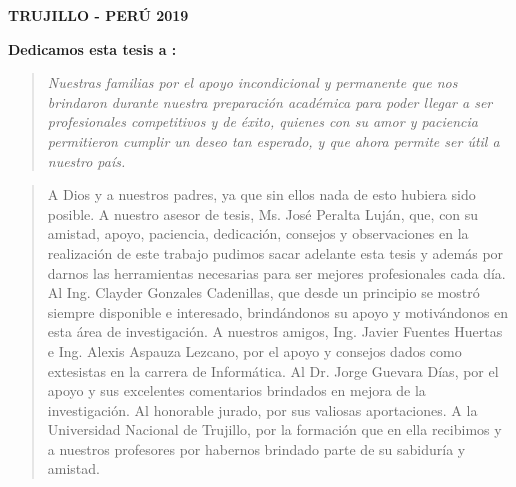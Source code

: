 \vskip 1.1cm
\begin{center}    
{\bf {\fontsize{14}{16.8}\selectfont TRUJILLO - PERÚ
\vskip 0.0cm
\hspace*{-0.2cm} 
2019 }}
\end{center} 
\newpage


 \pagestyle{plain}
 {\bf\Large {Dedicamos esta tesis a :}}
 \vskip 1cm
\begin{quotation}
{\it Nuestras familias por el apoyo incondicional y permanente que nos brindaron durante nuestra preparación académica para poder llegar a ser profesionales competitivos y de éxito, quienes con su amor y paciencia permitieron cumplir un deseo tan esperado, y que ahora permite ser útil a nuestro país.}
\end{quotation}


\newpage

 {\bf\Large {}}
\vskip 0.2cm
\begin{quotation}
A Dios y a nuestros padres, ya que sin ellos nada de esto hubiera sido posible.
{\vskip 0.2cm}
A nuestro asesor de tesis, Ms. José Peralta Luján, que, con su amistad, apoyo, paciencia, dedicación, consejos y observaciones en la realización de este trabajo pudimos sacar adelante esta tesis y además por darnos las herramientas necesarias para ser mejores profesionales cada día.
\vskip 0.2cm
Al Ing. Clayder Gonzales Cadenillas, que desde un principio se mostró siempre disponible e interesado, brindándonos su apoyo y motivándonos en esta área de investigación.
\vskip 0.2cm
A nuestros amigos, Ing. Javier Fuentes Huertas e Ing. Alexis Aspauza Lezcano, por el apoyo y consejos dados como extesistas en la carrera de Informática.
\vskip 0.2cm
Al Dr. Jorge Guevara Días, por el apoyo y sus excelentes comentarios brindados en mejora de la investigación.
\vskip 0.2cm
Al honorable jurado, por sus valiosas aportaciones.
\vskip 0.2cm
A la Universidad Nacional de Trujillo, por la formación que en ella recibimos y a nuestros profesores por habernos brindado parte de su sabiduría y amistad.
 \end{quotation}



